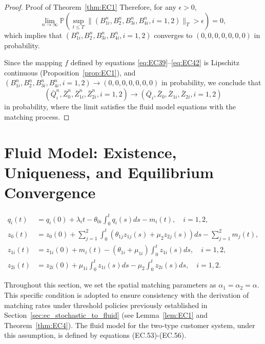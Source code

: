 \begin{proof}{Proof of Theorem~\ref{thm:EC1}}
Therefore, for any $\epsilon > 0$,
\begin{equation*}
\lim_{n \to \infty} \mathbb{P}\left(\sup_{t \le T} \|(B^n_{1i}, B^n_2, B^n_{3i}, B^n_{4i}, i=1,2)\|_T > \epsilon\right) = 0,
\end{equation*}
which implies that $(B^n_{1i}, B^n_2, B^n_{3i}, B^n_{4i}, i=1,2)$ converges to $(0,0,0,0,0,0,0)$ in probability.

Since the mapping $f$ defined by equations \eqref{eq:EC39}--\eqref{eq:EC42} is Lipschitz continuous (Proposition~\ref{prop:EC1}), and $(B^n_{1i}, B^n_2, B^n_{3i}, B^n_{4i}, i=1,2) \to (0,0,0,0,0,0,0)$ in probability, we conclude that
\begin{equation*}
(\bar{Q}^n_i, \bar{Z}^n_0, \bar{Z}^n_{1i}, \bar{Z}^n_{2i}, i=1,2) \to (\bar{Q}_i, \bar{Z}_0, \bar{Z}_{1i}, \bar{Z}_{2i}, i=1,2)
\end{equation*}
in probability, where the limit satisfies the fluid model equations with the matching process.
\Halmos
\end{proof}

\section{Fluid Model: Existence, Uniqueness, and Equilibrium Convergence}
\label{sec:EC of fluid model convergence}

\begin{align}
q_i(t) &= q_i(0) + \lambda_i t - \theta_{0i}\int_0^t q_i(s)ds - m_i(t), \quad i=1,2, \label{eq:EC.53}  \\
z_0(t) &= z_0(0) + \sum_{j=1}^{2}\int_0^t (\theta_{1j}z_{1j}(s) + \mu_2z_{2j}(s))ds - \sum_{j=1}^{2} m_j(t), \label{eq:EC.54} \\
z_{1i}(t) &= z_{1i}(0) + m_i(t) - (\theta_{1i} + \mu_{1i})\int_0^t z_{1i}(s)ds, \quad i=1,2, \label{eq:EC.55}  \\
z_{2i}(t) &= z_{2i}(0) + \mu_{1i}\int_0^t z_{1i}(s)ds - \mu_2\int_0^t z_{2i}(s)ds, \quad i=1,2. \label{eq:EC.56} 
\end{align}

Throughout this section, we set the spatial matching parameters as $\alpha_1 = \alpha_2 = \alpha$.
This specific condition is adopted to ensure consistency with the derivation of matching rates under threshold policies previously established in Section~\ref{sec:ec_stochastic_to_fluid} (see Lemma~\ref{lem:EC1} and Theorem~\ref{thm:EC4}).
The fluid model for the two-type customer system, under this assumption, is defined by equations (EC.53)-(EC.56).

